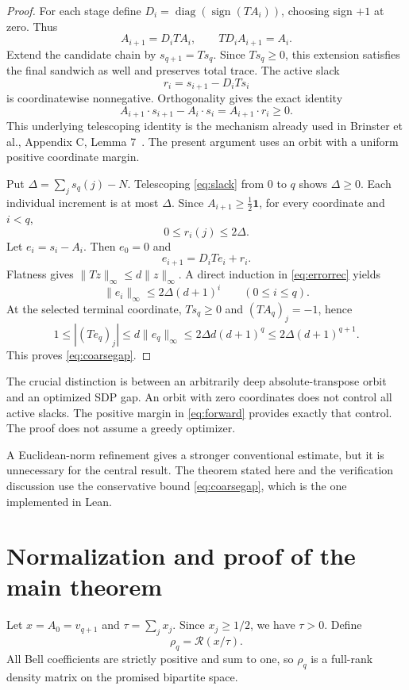 \documentclass[11pt]{article}
\newcommand{\one}{\mathbf1}
\newcommand{\syn}{\mathcal R}
\newcommand{\diag}{\operatorname{diag}}
\begin{document}
\begin{proof}
For each stage define $D_i=\diag(\operatorname{sign}(TA_i))$, choosing
sign $+1$ at zero. Thus
\[
A_{i+1}=D_iTA_i,\qquad TD_iA_{i+1}=A_i.
\]
Extend the candidate chain by $s_{q+1}=Ts_q$. Since $Ts_q\ge0$, this
extension satisfies the final sandwich as well and preserves total trace.
The active slack
\[
r_i=s_{i+1}-D_iTs_i
\]
is coordinatewise nonnegative. Orthogonality gives the exact identity
\begin{equation}\label{eq:slack}
A_{i+1}\cdot s_{i+1}-A_i\cdot s_i=A_{i+1}\cdot r_i\ge0.
\end{equation}
This underlying telescoping identity is the mechanism already used in
Brinster et al., Appendix C, Lemma 7~\cite{Brinster}. The present argument
uses an orbit with a uniform positive coordinate margin.

Put $\Delta=\sum_js_q(j)-N$. Telescoping \eqref{eq:slack} from $0$ to $q$
shows $\Delta\ge0$. Each individual increment is at most $\Delta$.
Since $A_{i+1}\ge\tfrac12\one$, for every coordinate and $i<q$,
\[
0\le r_i(j)\le2\Delta.
\]
Let $e_i=s_i-A_i$. Then $e_0=0$ and
\begin{equation}\label{eq:errorrec}
e_{i+1}=D_iTe_i+r_i.
\end{equation}
Flatness gives $\|Tz\|_\infty\le d\|z\|_\infty$. A direct induction in
\eqref{eq:errorrec} yields
\[
\|e_i\|_\infty\le2\Delta(d+1)^i\qquad(0\le i\le q).
\]
At the selected terminal coordinate, $Ts_q\ge0$ and $(TA_q)_j=-1$, hence
\[
1\le|(Te_q)_j|\le d\|e_q\|_\infty
\le2\Delta d(d+1)^q\le2\Delta(d+1)^{q+1}.
\]
This proves \eqref{eq:coarsegap}.
\end{proof}

The crucial distinction is between an arbitrarily deep absolute-transpose
orbit and an optimized SDP gap. An orbit with zero coordinates does not
control all active slacks. The positive margin in \eqref{eq:forward}
provides exactly that control. The proof does not assume a greedy optimizer.

A Euclidean-norm refinement gives a stronger conventional estimate, but it
is unnecessary for the central result. The theorem stated here and the verification
discussion use the conservative bound \eqref{eq:coarsegap}, which is
the one implemented in Lean.

\section{Normalization and proof of the main theorem}
Let $x=A_0=v_{q+1}$ and $\tau=\sum_jx_j$. Since $x_j\ge1/2$, we have
$\tau>0$. Define
\begin{equation}\label{eq:state}
\rho_q=\syn(x/\tau).
\end{equation}
All Bell coefficients are strictly positive and sum to one, so $\rho_q$
is a full-rank density matrix on the promised bipartite space.
\end{document}
